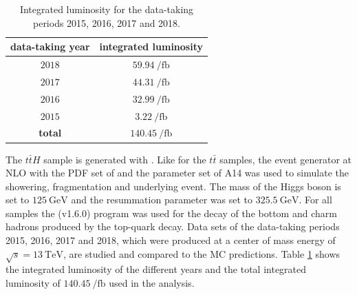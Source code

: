 \begin{table}[htbp]
		\centering
                \renewcommand{\arraystretch}{1.2}       
		\begin{tabular*}{\linewidth}{@{\extracolsep{\fill}}cc}
		\hline
		\hline
		\textbf{data-taking year}&  \textbf{integrated luminosity}
		\\
		\hline
                $2018$                & $\SI{59.94}{\per\femto\barn}$
                \\
                $2017$                & $\SI{44.31}{\per\femto\barn}$
                \\
                $2016$                & $\SI{32.99}{\per\femto\barn}$
                \\
                $2015$                & $\SI{3.22}{\per\femto\barn}$
                \\
                \hline
                \textbf{total}        & $\SI{140.45}{\per\femto\barn}$
                \\
		\hline
		\hline
		\end{tabular*}
		\caption[Integrated luminosity for the data-taking periods 2015-2018.]{Integrated luminosity for the data-taking periods 2015, 2016, 2017 and 2018.}
\label{datalumi}
\renewcommand{\arraystretch}{1}
\end{table}
%
The $t\bar{t}H$ sample is generated with {\POWHEG}. Like for the $t\bar{t}$ samples, the event generator {\Pythia} at NLO with the PDF set of {\NNPDFz} and the parameter set of A14 was used to simulate the showering, fragmentation and underlying event. The mass of the Higgs boson is set to $\SI{125}{\giga\electronvolt}$ and the resummation parameter was set to $\SI{325.5}{\giga\electronvolt}$. \newline
For all samples the {\EvtGen} (v1.6.0) \cite{EvtGen} program was used for the decay of the bottom and charm hadrons produced by the top-quark decay.\newline
Data sets of the data-taking periods 2015, 2016, 2017 and 2018, which were produced at a center of mass energy of $\sqrt{s}=\SI{13}{\tera\electronvolt}$, are studied and compared to the MC predictions. Table \ref{datalumi} shows the integrated luminosity of the different years and the total integrated luminosity of $\SI{140.45}{\per\femto\barn}$ used in the analysis. 
